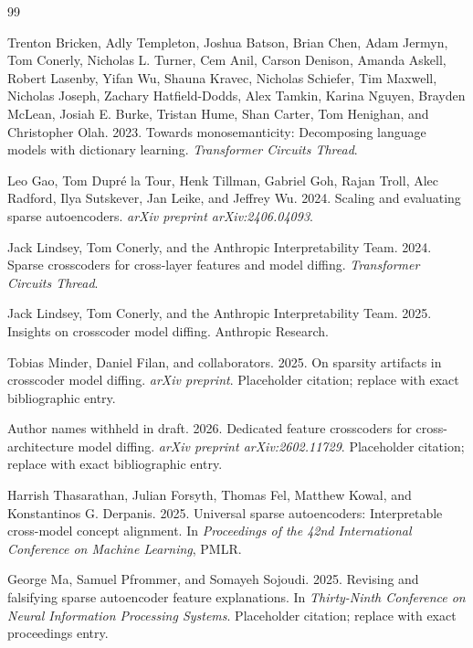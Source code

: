 \documentclass[11pt]{article}
\begin{document}

\begin{thebibliography}{99}

Trenton Bricken, Adly Templeton, Joshua Batson, Brian Chen, Adam Jermyn, Tom Conerly, Nicholas L. Turner, Cem Anil, Carson Denison, Amanda Askell, Robert Lasenby, Yifan Wu, Shauna Kravec, Nicholas Schiefer, Tim Maxwell, Nicholas Joseph, Zachary Hatfield-Dodds, Alex Tamkin, Karina Nguyen, Brayden McLean, Josiah E. Burke, Tristan Hume, Shan Carter, Tom Henighan, and Christopher Olah. 2023.
\newblock Towards monosemanticity: Decomposing language models with dictionary learning.
\newblock \emph{Transformer Circuits Thread}.

Leo Gao, Tom Dupr\'{e} la Tour, Henk Tillman, Gabriel Goh, Rajan Troll, Alec Radford, Ilya Sutskever, Jan Leike, and Jeffrey Wu. 2024.
\newblock Scaling and evaluating sparse autoencoders.
\newblock \emph{arXiv preprint arXiv:2406.04093}.

Jack Lindsey, Tom Conerly, and the Anthropic Interpretability Team. 2024.
\newblock Sparse crosscoders for cross-layer features and model diffing.
\newblock \emph{Transformer Circuits Thread}.

Jack Lindsey, Tom Conerly, and the Anthropic Interpretability Team. 2025.
\newblock Insights on crosscoder model diffing.
\newblock Anthropic Research.

Tobias Minder, Daniel Filan, and collaborators. 2025.
\newblock On sparsity artifacts in crosscoder model diffing.
\newblock \emph{arXiv preprint}. Placeholder citation; replace with exact bibliographic entry.

Author names withheld in draft. 2026.
\newblock Dedicated feature crosscoders for cross-architecture model diffing.
\newblock \emph{arXiv preprint arXiv:2602.11729}. Placeholder citation; replace with exact bibliographic entry.

Harrish Thasarathan, Julian Forsyth, Thomas Fel, Matthew Kowal, and Konstantinos G. Derpanis. 2025.
\newblock Universal sparse autoencoders: Interpretable cross-model concept alignment.
\newblock In \emph{Proceedings of the 42nd International Conference on Machine Learning}, PMLR.

George Ma, Samuel Pfrommer, and Somayeh Sojoudi. 2025.
\newblock Revising and falsifying sparse autoencoder feature explanations.
\newblock In \emph{Thirty-Ninth Conference on Neural Information Processing Systems}. Placeholder citation; replace with exact proceedings entry.

\end{thebibliography}
\end{document}
